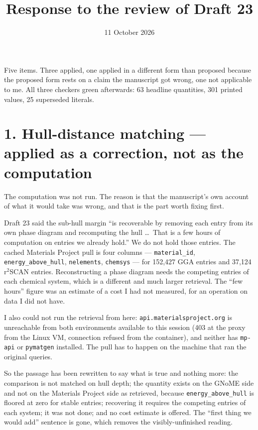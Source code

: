 \documentclass[11pt]{article}
\title{\textbf{Response to the review of Draft 23}}
\author{}
\date{11 October 2026}
\begin{document}
\maketitle
\vspace{-3em}

Five items. Three applied, one applied in a different form than proposed because the
proposed form rests on a claim the manuscript got wrong, one not applicable to me.
All three checkers green afterwards: 63 headline quantities, 301 printed values,
25 superseded literals.

\section*{1. Hull-distance matching --- applied as a correction, not as the computation}

The computation was not run. The reason is that the manuscript's own account of what it
would take was wrong, and that is the part worth fixing first.

Draft 23 said the sub-hull margin ``is recoverable by removing each entry from its own
phase diagram and recomputing the hull \ldots\ That is a few hours of computation on
entries we already hold.'' We do not hold those entries. The cached Materials Project pull
is four columns --- \texttt{material\_id}, \texttt{energy\_above\_hull},
\texttt{nelements}, \texttt{chemsys} --- for 152{,}427 GGA entries and 37{,}124 r$^2$SCAN
entries. Reconstructing a phase diagram needs the competing entries of each chemical
system, which is a different and much larger retrieval. The ``few hours'' figure was an
estimate of a cost I had not measured, for an operation on data I did not have.

I also could not run the retrieval from here: \texttt{api.materialsproject.org} is
unreachable from both environments available to this session (403 at the proxy from the
Linux VM, connection refused from the container), and neither has \texttt{mp-api} or
\texttt{pymatgen} installed. The pull has to happen on the machine that ran the original
queries.

So the passage has been rewritten to say what is true and nothing more: the comparison is
not matched on hull depth; the quantity exists on the GNoME side and not on the Materials
Project side as retrieved, because \texttt{energy\_above\_hull} is floored at zero for
stable entries; recovering it requires the competing entries of each system; it was not
done; and no cost estimate is offered. The ``first thing we would add'' sentence is gone,
which removes the visibly-unfinished reading.
\end{document}
